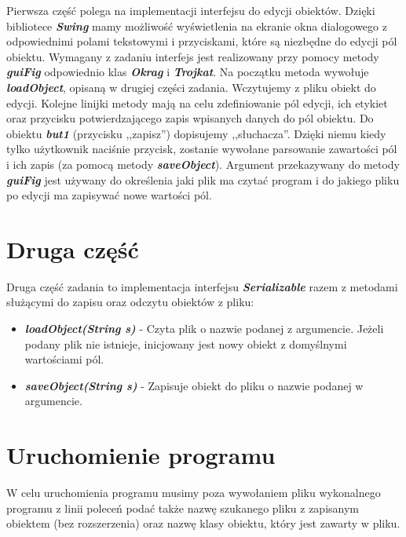 \documentclass[12pt]{article}
\begin{document}
	Pierwsza część polega na implementacji interfejsu do edycji obiektów. Dzięki bibliotece \textbf{\textit{Swing}} mamy możliwość wyświetlenia na ekranie okna dialogowego z odpowiednimi polami tekstowymi i przyciskami, które są niezbędne do edycji pól obiektu. Wymagany z zadaniu interfejs jest realizowany przy pomocy metody \textbf{\textit{guiFig}} odpowiednio klas \textbf{\textit{Okrag}} i \textbf{\textit{Trojkat}}. Na początku metoda wywołuje \textbf{\textit{loadObject}}, opisaną w drugiej części zadania. Wczytujemy z pliku obiekt do edycji. Kolejne linijki metody mają na celu zdefiniowanie pól edycji, ich etykiet oraz przycisku potwierdzającego zapis wpisanych danych do pól obiektu. Do obiektu \textbf{\textit{but1}} (przycisku ,,zapisz'') dopisujemy ,,słuchacza''. Dzięki niemu kiedy tylko użytkownik naciśnie przycisk, zostanie wywołane parsowanie zawartości pól i ich zapis (za pomocą metody \textbf{\textit{saveObject}}). Argument przekazywany do metody \textbf{\textit{guiFig}} jest używany do określenia jaki plik ma czytać program i do jakiego pliku po edycji ma zapisywać nowe wartości pól.
	
\section{Druga część}

	Druga część zadania to implementacja interfejsu \textbf{\textit{Serializable}} razem z metodami służącymi do zapisu oraz odczytu obiektów z pliku:
	\begin{itemize}
	\item \textbf{\textit{loadObject(String s)}} - Czyta plik o nazwie podanej z argumencie. Jeżeli podany plik nie istnieje, inicjowany jest nowy obiekt z domyślnymi wartościami pól. 
	\item \textbf{\textit{saveObject(String s)}} - Zapisuje obiekt do pliku o nazwie podanej w argumencie. 
	\end{itemize}

\section{Uruchomienie programu}

	W celu uruchomienia programu musimy poza wywołaniem pliku wykonalnego programu z linii poleceń podać także nazwę szukanego pliku z zapisanym obiektem (bez rozszerzenia) oraz nazwę klasy obiektu, który jest zawarty w pliku.
	
	 
\end{document}

